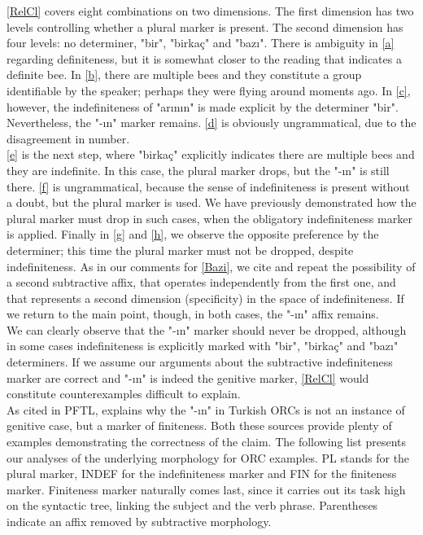 \documentclass[11pt]{article} %
\begin{document}
\ref{RelCl} covers eight combinations on two dimensions. The first dimension has two levels controlling whether a plural marker is present. The second dimension has four levels: no determiner, "bir", "birkaç" and "bazı". There is ambiguity in \ref{a} regarding definiteness, but it is somewhat closer to the reading that indicates a definite bee. In \ref{b}, there are multiple bees and they constitute a group identifiable by the speaker; perhaps they were flying around moments ago. In \ref{c}, however, the indefiniteness of "arının" is made explicit by the determiner "bir". Nevertheless, the "-ın" marker remains. \ref{d} is obviously ungrammatical, due to the disagreement in number. \\ 

\ref{e} is the next step, where "birkaç" explicitly indicates there are multiple bees and they are indefinite. In this case, the plural marker drops, but the "-ın" is still there. \ref{f} is ungrammatical, because the sense of indefiniteness is present without a doubt, but the plural marker is used. We have previously demonstrated how the plural marker must drop in such cases, when the obligatory indefiniteness marker is applied. Finally in \ref{g} and \ref{h}, we observe the opposite preference by the determiner; this time the plural marker must not be dropped, despite indefiniteness. As in our comments for \ref{Bazi}, we cite \citet{Bliss2004} and repeat the possibility of a second subtractive affix, that operates independently from the first one, and that represents a second dimension (specificity) in the space of indefiniteness. If we return to the main point, though, in both cases, the "-ın" affix remains. \\

We can clearly observe that the "-ın" marker should never be dropped, although in some cases indefiniteness is explicitly marked with "bir", "birkaç" and "bazı" determiners. If we assume our arguments about the subtractive indefiniteness marker are correct and "-ın" is indeed the genitive marker, \ref{RelCl} would constitute counterexamples difficult to explain. \\

As cited in PFTL, \citet{GeorgeKornfilt1981} explains why the "-ın" in Turkish ORCs is not an instance of genitive case, but a marker of finiteness. Both these sources provide plenty of examples demonstrating the correctness of the claim. The following list presents our analyses of the underlying morphology for ORC examples. PL stands for the plural marker, INDEF for the indefiniteness marker and FIN for the finiteness marker. Finiteness marker naturally comes last, since it carries out its task high on the syntactic tree, linking the subject and the verb phrase. Parentheses indicate an affix removed by subtractive morphology.
\end{document}
